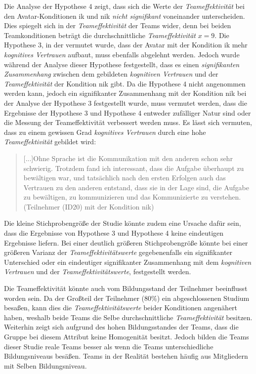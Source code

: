 \documentclass[a4paper,11pt]{article}%
\renewcommand{\\}{\vspace*{0.5\baselineskip} \newline}
\begin{document}
{{Die Analyse der Hypothese 4 zeigt, dass sich die Werte der \textit{Teameffektivität} bei den Avatar-Konditionen \ac{ik} und \ac{nik} \textit{nicht signifikant} voneinander unterscheiden. Dies spiegelt sich in der \textit{Teameffektivität} der Teams wider, denn bei beiden Teamkonditionen beträgt die durchschnittliche \textit{Teameffektivität} $x = 9$.
Die Hypothese 3, in der vermutet wurde, dass der Avatar mit der Kondition \ac{ik} mehr \textit{kognitives Vertrauen} aufbaut, muss ebenfalls abgelehnt werden. Jedoch wurde während der Analyse dieser Hypothese festgestellt, dass es einen \textit{signifikanten Zusammenhang} zwischen dem gebildeten \textit{kognitiven Vertrauen} und der \textit{Teameffektivität} der Kondition \ac{nik} gibt. Da die Hypothese 4 nicht angenommen werden kann, jedoch ein signifikanter Zusammenhang mit der Kondition \ac{nik} bei der Analyse der Hypothese 3 festgestellt wurde, muss vermutet werden, dass die Ergebnisse der Hypothese 3 und Hypothese 4 entweder zufälliger Natur sind oder die Messung der Teameffektivität verbessert werden muss.
Es lässt sich vermuten, dass zu einem gewissen Grad \textit{kognitives Vertrauen} durch eine hohe \textit{Teameffektivität} gebildet wird: 
\begin{quote}
\glqq{}[...]Ohne Sprache ist die Kommunikation mit den anderen schon sehr schwierig. Trotzdem fand ich interessant, dass die Aufgabe überhaupt zu bewältigen war, und tatsächlich nach den ersten Erfolgen auch das Vertrauen zu den anderen entstand, dass sie in der Lage sind, die Aufgabe zu bewältigen, zu kommunizieren und das Kommunizierte zu verstehen.\dq{} (Teilnehmer (ID20) mit der Kondition \ac{nik}) 
\end{quote}

Die kleine Stichprobengröße der Studie könnte zudem eine Ursache dafür sein, dass die Ergebnisse von Hypothese 3 und Hypothese 4 keine eindeutigen Ergebnisse liefern. Bei einer deutlich größeren Stichprobengröße könnte bei einer größeren Varianz der \textit{Teameffektivitätswerte} gegebenenfalls ein signifikanter Unterschied oder ein eindeutiger signifikanter Zusammenhang mit dem \textit{kognitiven Vertrauen} und der \textit{Teameffektivitätswerte}, festgestellt werden.

Die Teameffektivität könnte auch vom Bildungsstand der Teilnehmer beeinflusst worden sein. Da der Großteil der Teilnehmer (80\%) ein abgeschlossenen Studium besaßen, kann dies die \textit{Teameffektivitätswerte} beider Konditionen angenähert haben, weshalb beide Teams die Selbe durchschnittliche \textit{Teameffektivität} besitzen. Weiterhin zeigt sich aufgrund des hohen Bildungsstandes der Teams, dass die Gruppe bei diesem Attribut keine Homogenität besitzt. Jedoch bilden die Teams dieser Studie reale Teams besser als wenn die Teams unterschiedliche Bildungsniveaus besäßen. Teams in der Realität bestehen häufig aus Mitgliedern mit Selben Bildungsniveau.

}}
\end{document}
